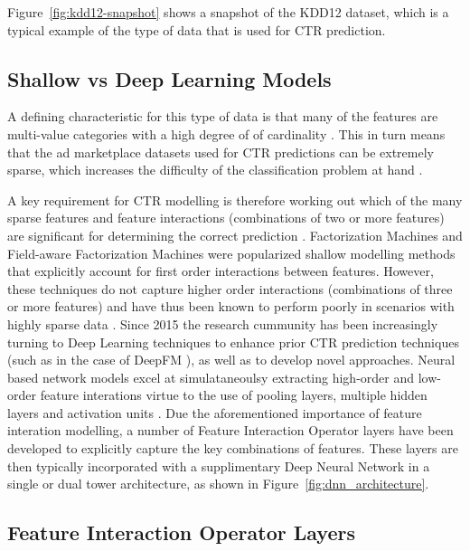 \documentclass{mldsmsc}
\begin{document}
Figure~\ref{fig:kdd12-snapshot} shows a snapshot of the KDD12 dataset, which is a typical example of 
the type of data that is used for CTR prediction.

\subsection{Shallow vs Deep Learning Models}

A defining characteristic for this type of data is that many of the features are multi-value categories with 
a high degree of of cardinality \citep{RefWorks:he2017neural}. This in turn means that the ad marketplace datasets used for CTR predictions can be extremely sparse, which increases the difficulty of the classification problem at 
hand \citep{RefWorks:gu2021ad}.

A key requirement for CTR modelling is therefore working out which of the many sparse features and feature 
interactions (combinations of two or more features) are significant for determining the correct prediction 
\citep{RefWorks:gu2021ad}. Factorization Machines \citep{RefWorks:rendle2010factorization} and Field-aware Factorization Machines \citep{RefWorks:juan2016field-aware}
were popularized shallow modelling methods that explicitly account for first order interactions between features. 
However, these techniques do not capture higher order interactions (combinations of three or more features) and 
have thus been known to perform poorly in scenarios with highly sparse data \citep{RefWorks:zhang2021deep}. Since 2015 the 
research cummunity has been increasingly turning to Deep Learning techniques to enhance prior CTR prediction 
techniques (such as in the case of DeepFM \citep{RefWorks:guo2017deepfm:}), as well as to develop novel approaches. Neural based 
network models excel at simulataneoulsy extracting high-order and low-order feature interations virtue to the use 
of pooling layers, multiple hidden layers and activation units \cite{RefWorks:gu2021ad}. Due the aforementioned importance of 
feature interation modelling, a number of Feature Interaction Operator layers have been developed to explicitly 
capture the key combinations of features. These layers are then typically incorporated with a supplimentary Deep 
Neural Network in a single or dual tower architecture, as shown in Figure~\ref{fig:dnn_architecture}.

\subsection{Feature Interaction Operator Layers}
\end{document}
